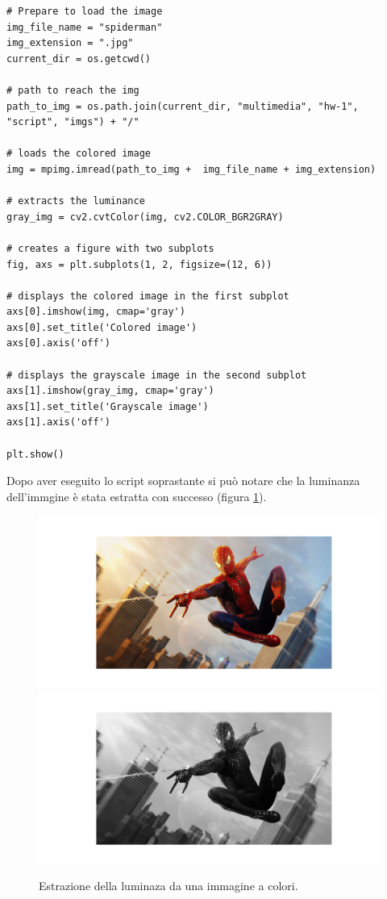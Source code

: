 \begin{lstlisting}
# Prepare to load the image
img_file_name = "spiderman"
img_extension = ".jpg"
current_dir = os.getcwd()

# path to reach the img
path_to_img = os.path.join(current_dir, "multimedia", "hw-1", "script", "imgs") + "/"

# loads the colored image
img = mpimg.imread(path_to_img +  img_file_name + img_extension) 

# extracts the luminance
gray_img = cv2.cvtColor(img, cv2.COLOR_BGR2GRAY)

# creates a figure with two subplots
fig, axs = plt.subplots(1, 2, figsize=(12, 6))

# displays the colored image in the first subplot
axs[0].imshow(img, cmap='gray')
axs[0].set_title('Colored image')
axs[0].axis('off')

# displays the grayscale image in the second subplot
axs[1].imshow(gray_img, cmap='gray')
axs[1].set_title('Grayscale image')
axs[1].axis('off')

plt.show()
\end{lstlisting}

\noindent Dopo aver eseguito lo script soprastante si può notare che la luminanza dell'immgine è stata estratta con successo (figura \ref{fig:luminanza}).

\begin{figure}
    \centering
    \includegraphics[width = .7\textwidth]{hw-1/report/imgs/colored.png}
    \includegraphics[width = .7\textwidth]{hw-1/report/imgs/grayscale.png}
    \caption{Estrazione della luminaza da una immagine a colori.}
    \label{fig:luminanza}
\end{figure}

